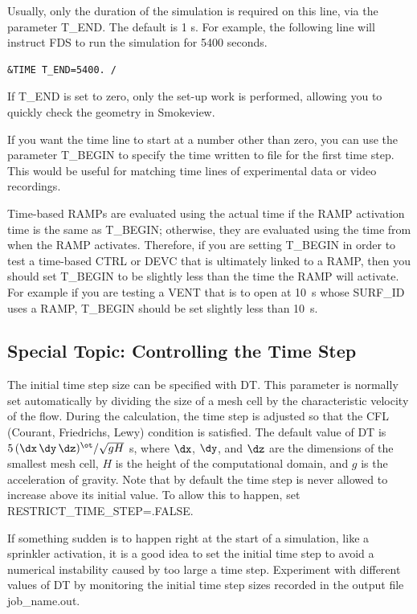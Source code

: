 \documentclass[11pt]{book}
\begin{document}
Usually, only the
duration of the simulation is required on this line, via the
parameter {\ct T\_END}. The default is 1 s.
For example, the following line will instruct FDS to run the simulation for 5400 seconds.
\begin{lstlisting}
&TIME T_END=5400. /
\end{lstlisting}
If {\ct T\_END} is set to zero, only the set-up work is performed,
allowing you to quickly check the geometry in Smokeview.

If you want the time line to start at a number other than zero, you can use the parameter
{\ct T\_BEGIN} to specify the time written to file for the first time step.
This would be useful for matching time lines of experimental data or video recordings.

Time-based {\ct RAMP}s are evaluated using the actual time if the {\ct RAMP} activation time is the same as
{\ct T\_BEGIN}; otherwise, they are evaluated using the time from when the {\ct RAMP} activates.  Therefore, if you are
setting {\ct T\_BEGIN} in order to test a time-based {\ct CTRL} or {\ct DEVC} that is ultimately
linked to a {\ct RAMP}, then you should set {\ct T\_BEGIN} to be slightly less than the time the {\ct RAMP} will activate.
For example if you are testing a {\ct VENT} that is to open at 10~s whose {\ct SURF\_ID} uses a {\ct RAMP},
{\ct T\_BEGIN} should be set slightly less than 10~s.


\subsection{Special Topic: Controlling the Time Step}
\label{info:TIME_Control}

The initial time step size can be specified with
{\ct DT}. This parameter is normally set automatically by dividing the size of a mesh cell by the
characteristic velocity of the flow.
During the calculation, the time step is adjusted so that the CFL (Courant, Friedrichs, Lewy) condition is
satisfied. The default value of {\ct DT} is $5 \, (\dx \, \dy \, \dz)^\ot/\sqrt{gH}$ s, where
$\dx$, $\dy$, and $\dz$ are the dimensions of the smallest mesh
cell, $H$ is the height of the computational domain, and $g$ is the acceleration of gravity. Note that by default the
time step is never allowed to increase above its initial value. To allow this to happen, set
{\ct RESTRICT\_TIME\_STEP=.FALSE.}

If something sudden is to happen right at the start of a simulation,
like a sprinkler activation, it is a good idea to set the initial time step
to avoid a numerical instability caused by too large a time step.
Experiment with different values of {\ct DT} by monitoring the initial time step sizes
recorded in the output file {\ct job\_name.out}.
\end{document}
